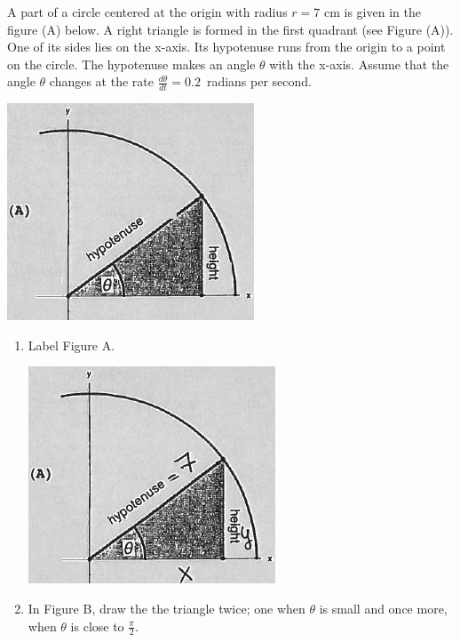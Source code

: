 \documentclass[nooutcomes]{ximera}
\begin{document}
\begin{problem}
A part of a circle centered at the origin with radius $r=7$ cm is given in the figure (A) below.  A right triangle is formed in the first quadrant (see Figure (A)).  One of its sides lies on the x-axis.  Its hypotenuse runs from the origin to a point on the circle.  The hypotenuse makes an angle $\theta$ with the x-axis.  Assume that the angle $\theta$ changes at the rate $\frac{d\theta}{dt}=0.2$\ radians per second.
	\begin{image}
	\includegraphics[scale=.5]{Figure10.png}
	\end{image}
	
\begin{enumerate}
	\item Label Figure A.
		\begin{freeResponse} \hfil
		\begin{image}
	\includegraphics[scale=.5]{Figure11.png}
	\end{image}
		\end{freeResponse}
	\item In Figure B, draw the the triangle twice; one when $\theta$ is small and once more, when $\theta$ is close to $\frac{\pi}{2}$.


\end{enumerate}
\end{problem}
\end{document}
